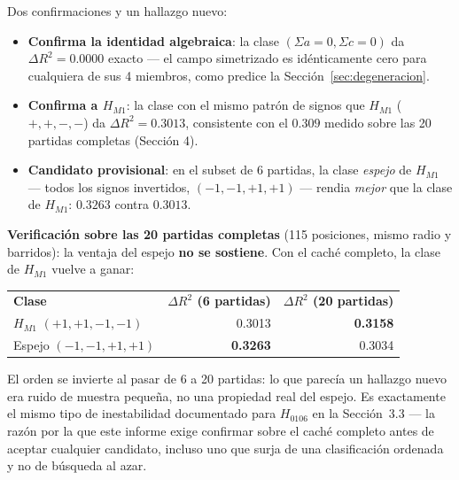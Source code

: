 \documentclass[11pt, a4paper]{article}
\newcommand{\TH}[1]{\cellcolor{cTHbg}\color{white}\textbf{#1}}
\newcommand{\good}[1]{\color{cGood}\textbf{#1}}
\begin{document}
Dos confirmaciones y un hallazgo nuevo:

\begin{itemize}
  \item \textbf{Confirma la identidad algebraica}: la clase
        $(\Sigma a{=}0,\Sigma c{=}0)$ da $\Delta R^2=0.0000$ exacto
        --- el campo simetrizado es id\'enticamente cero para
        cualquiera de sus 4 miembros, como predice la
        Secci\'on~\ref{sec:degeneracion}.
  \item \textbf{Confirma a $H_{M1}$}: la clase con el mismo patr\'on de
        signos que $H_{M1}$ ($+,+,-,-$) da $\Delta R^2=0.3013$,
        consistente con el $0.309$ medido sobre las 20 partidas
        completas (Secci\'on 4).
  \item \textbf{Candidato provisional}: en el subset de 6 partidas, la
        clase \emph{espejo} de $H_{M1}$ --- todos los signos
        invertidos, $(-1,-1,+1,+1)$ --- rendia \emph{mejor} que la
        clase de $H_{M1}$: $0.3263$ contra $0.3013$.
\end{itemize}

\begin{tcolorbox}[quotebox]
  \textbf{Verificaci\'on sobre las 20 partidas completas} (115
  posiciones, mismo radio y barridos): la ventaja del espejo
  \textbf{no se sostiene}. Con el cach\'e completo, la clase de
  $H_{M1}$ vuelve a ganar:

  \medskip
  \begin{center}
  \begin{tabular}{lrr}
    \TH{Clase} & \TH{$\Delta R^2$ (6 partidas)} & \TH{$\Delta R^2$ (20 partidas)} \\[1pt]
    $H_{M1}$ $(+1,+1,-1,-1)$ & 0.3013 & \good{0.3158} \\
    Espejo $(-1,-1,+1,+1)$   & \good{0.3263} & 0.3034 \\
  \end{tabular}
  \end{center}
  \medskip

  El orden se invierte al pasar de 6 a 20 partidas: lo que parec\'ia
  un hallazgo nuevo era ruido de muestra peque\~na, no una propiedad
  real del espejo. Es exactamente el mismo tipo de inestabilidad
  documentado para $H_{0106}$ en la Secci\'on~3.3 --- la raz\'on por
  la que este informe exige confirmar sobre el cach\'e completo antes
  de aceptar cualquier candidato, incluso uno que surja de una
  clasificaci\'on ordenada y no de b\'usqueda al azar.
\end{tcolorbox}
\end{document}
